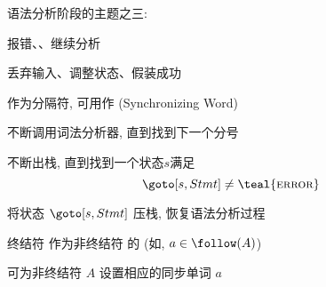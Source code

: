 
\begin{frame}{}
  \begin{center}
    语法分析阶段的主题之三: 


    报错、、继续分析
  \end{center}
\end{frame}

\begin{frame}{}

  \vspace{0.30cm}
  \begin{center}
     丢弃输入、调整状态、假装成功
  \end{center}
\end{frame}

\begin{frame}{}
  \begin{center}
    作为分隔符, 可用作 (Synchronizing Word)

    \vspace{0.80cm}
    \begin{description}
      \setlength{\itemsep}{15pt}
      \item[丢弃输入:] 不断调用词法分析器, 直到找到下一个分号
      \item[调整状态:] 不断出栈, 直到找到一个状态$s$满足
        \[
          \goto[s, Stmt] \neq \teal{\textsc{error}}
        \]
      \item[假装成功:] 将状态 $\goto[s, Stmt]$ 压栈, 恢复语法分析过程
    \end{description}

    \pause
    \vspace{0.80cm}
    终结符  作为非终结符  的 (如, $a \in \follow(A)$)

    \pause
    \vspace{0.50cm}
    可为非终结符 $A$ 设置相应的同步单词 $a$
  \end{center}
\end{frame}

